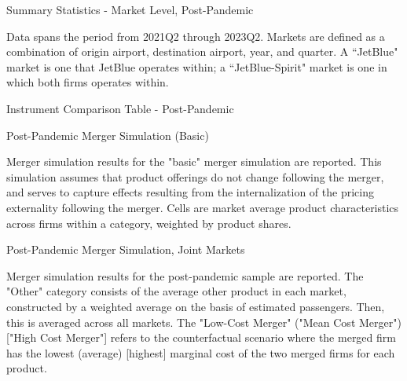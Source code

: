 \documentclass{article}
\begin{document}
\begin{appendices}
	\begin{table}
		\caption{Summary Statistics - Market Level, Post-Pandemic}
		\label{tab:SummaryStatistics_Market_Post}
		
		\footnotesize{Data spans the period from 2021Q2 through 2023Q2. Markets are defined as a combination of origin airport, destination airport, year, and quarter. A ``JetBlue" market is one that JetBlue operates within; a ``JetBlue-Spirit" market is one in which both firms operates within. }
	\end{table}
	
	\begin{landscape}
		\begin{table}
			\caption{Instrument Comparison Table - Post-Pandemic}
			\label{tab:Instrument_Compare}
			
		\end{table}
	\end{landscape}
	
\begin{table}
	\caption{Post-Pandemic Merger Simulation (Basic)}
	\label{tab:Simulation_Post_Basic}
	
	\footnotesize{Merger simulation results for the "basic" merger simulation are reported. This simulation assumes that product offerings do not change following the merger, and serves to capture effects resulting from the internalization of the pricing externality following the merger. Cells are market average product characteristics across firms within a category, weighted by product shares.}
\end{table}
	
	\begin{landscape}
		\begin{table}
			\caption{Post-Pandemic Merger Simulation, Joint Markets}
			\label{tab:Simulation_Post}
			
			\footnotesize{Merger simulation results for the post-pandemic sample are reported. The "Other" category consists of the average other product in each market, constructed by a weighted average on the basis of estimated passengers. Then, this is averaged across all markets. The "Low-Cost Merger" ("Mean Cost Merger") ["High Cost Merger"] refers to the counterfactual scenario where the merged firm has the lowest (average) [highest] marginal cost of the two merged firms for each product.}
		\end{table}
	\end{landscape}


\end{appendices}
\end{document}
